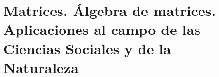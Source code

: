 \chapter{Matrices. Álgebra de matrices. Aplicaciones al campo de las Ciencias Sociales y de la Naturaleza}
